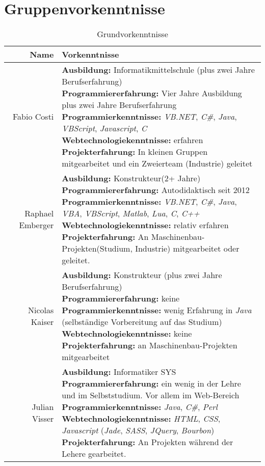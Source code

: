 \documentclass[10pt,a4paper,titlepage,twoside,german,final]{zhawreprt}
\begin{document}
\section{Gruppenvorkenntnisse}\label{chp:KnowHow}
\begin{table}[h!]
\begin{tabular}{|r|l|}
\hline
\textbf{Name} & \textbf{Vorkenntnisse}\\\hline\hline
Fabio Costi &
\parbox[t]{11cm}{\textbf{Ausbildung:} Informatikmittelschule (plus zwei Jahre Berufserfahrung)\\
\textbf{Programmiererfahrung:} Vier Jahre Ausbildung plus zwei Jahre Berufserfahrung\\
\textbf{Programmierkenntnisse:} \emph{VB.NET}, \emph{C\#}, \emph{Java}, \emph{VBScript}, \emph{Javascript}, \emph{C}\\
\textbf{Webtechnologiekenntnisse:} erfahren\\
\textbf{Projekterfahrung:} In kleinen Gruppen mitgearbeitet und ein Zweierteam (Industrie) geleitet
}\\\hline
Raphael Emberger &
\parbox[t]{11cm}{\textbf{Ausbildung:} Konstrukteur(2+ Jahre)\\
\textbf{Programmiererfahrung:} Autodidaktisch seit 2012\\
\textbf{Programmierkenntnisse:} \emph{VB.NET}, \emph{C\#}, \emph{Java}, \emph{VBA}, \emph{VBScript}, \emph{Matlab}, \emph{Lua}, \emph{C}, \emph{C++}\\
\textbf{Webtechnologiekenntnisse:} relativ erfahren\\
\textbf{Projekterfahrung:} An Maschinenbau-Projekten(Studium, Industrie) mitgearbeitet oder geleitet.
}\\\hline
Nicolas Kaiser &
\parbox[t]{11cm}{\textbf{Ausbildung:} Konstrukteur (plus zwei Jahre Berufserfahrung)\\
\textbf{Programmiererfahrung:} keine\\
\textbf{Programmierkenntnisse:} wenig Erfahrung in \emph{Java} (selbständige Vorbereitung auf das Studium)\\
\textbf{Webtechnologiekenntnisse:} keine\\
\textbf{Projekterfahrung:} an Maschinenbau-Projekten mitgearbeitet
}\\\hline
Julian Visser &
\parbox[t]{11cm}{\textbf{Ausbildung:} Informatiker SYS\\
\textbf{Programmiererfahrung:} ein wenig in der Lehre und im Selbststudium. Vor allem im Web-Bereich\\
\textbf{Programmierkenntnisse:} \emph{Java}, \emph{C\#}, \emph{Perl}\\
\textbf{Webtechnologiekenntnisse:} \emph{HTML}, \emph{CSS}, \emph{Javascript} (\emph{Jade}, \emph{SASS}, \emph{JQuery}, \emph{Bourbon})\\
\textbf{Projekterfahrung:} An Projekten während der Lehere gearbeitet.
}\\\hline
\end{tabular}\caption{Grundvorkenntnisse}\label{tbl:KnowHow}
\end{table}
\end{document}
